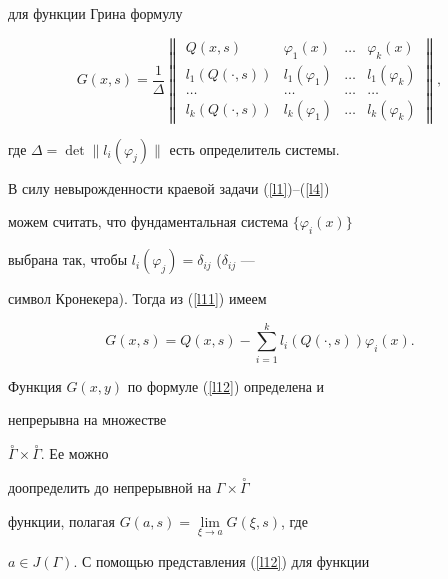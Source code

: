 {{{{{{{для функции Грина формулу 


\begin{equation}


\label{l11}


G(x,s)=\frac{1}{\Delta}


\begin{Vmatrix}


Q(x,s) & \varphi_1(x) & \dots & \varphi_k(x)\\


l_1(Q(\cdot,s)) & l_1(\varphi_1) & \dots & l_1(\varphi_k)\\


\dots & \dots & \dots & \dots \\


l_k(Q(\cdot,s)) & l_k(\varphi_1)& \dots & l_k(\varphi_k)


\end{Vmatrix}


,


\end{equation}


где $\Delta=\det\|l_i(\varphi_j)\|$ есть определитель системы.


В силу невырожденности краевой задачи (\ref{l1})--(\ref{l4})


можем считать, что фундаментальная система $\{\varphi_i(x)\}$


выбрана так, чтобы $l_i(\varphi_j)=\delta_{ij}$ ($\delta_{ij}$ ---


символ Кронекера). Тогда из (\ref{l11}) имеем


\begin{equation}


\label{l12}


G(x,s)=Q(x,s)-\sum^k_{i=1}l_i(Q(\cdot,s))\varphi_i(x).


\end{equation}





Функция $G(x,y)$ по формуле (\ref{l12}) определена и 


непрерывна на множестве


$\overset{\circ}{\Gamma}{}\times\overset{\circ}{\Gamma}$. Ее можно


доопределить до непрерывной на ${\Gamma}\times\overset{\circ}{\Gamma}$


функции, полагая $G(a,s)=\lim\limits_{\xi\to a}G(\xi,s)$, где


$a \in J(\Gamma)$. С помощью представления (\ref{l12}) для функции


}}}}}}}
